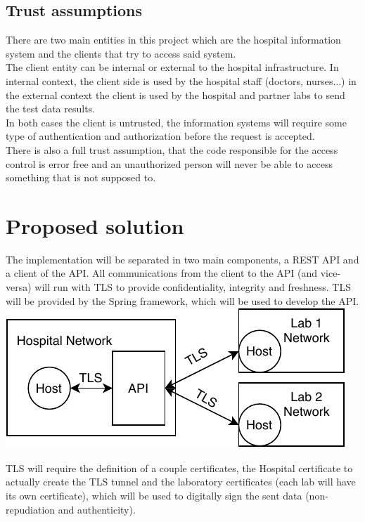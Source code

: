 \subsection{Trust assumptions}

There are two main entities in this project which are the hospital information system and the clients that try to access said system. \\

The client entity can be internal or external to the hospital infrastructure. In internal context, the client side is used by the hospital staff (doctors, nurses...) in the external context the client is used by the hospital and partner labs to send the test data results. \\

In both cases the client is untrusted, the information systems will require some type of authentication and authorization before the request is accepted. \\ 

There is also a full trust assumption, that the code responsible for the access control is error free and an unauthorized person will never be able to access something that is not supposed to. \\

\section{Proposed solution}

The implementation will be separated in two main components, a REST API and a client of the API.
All communications from the client to the API (and vice-versa) will run with TLS to provide confidentiality, integrity and freshness. TLS will be provided by the Spring framework, which will be used to develop the API. \\

	\includegraphics[width=.4\textwidth]{figs/network_layout.pdf}
	
TLS will require the definition of a couple certificates, the Hospital certificate to actually create the TLS tunnel and the laboratory certificates (each lab will have its own certificate), which will be used to digitally sign the sent data (non-repudiation and authenticity). \\ 

